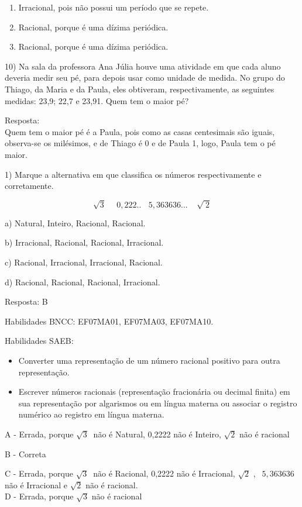 \begin{enumerate}
\def\labelenumi{\alph{enumi})}
\item
  Irracional, pois não possui um período que se repete.
\item
  Racional, porque é uma dízima periódica.
\item
  Racional, porque é uma dízima periódica.
\end{enumerate}

10) Na sala da professora Ana Júlia houve uma atividade em que cada
aluno deveria medir seu pé, para depois usar como unidade de medida. No
grupo do Thiago, da Maria e da Paula, eles obtiveram, respectivamente,
as seguintes medidas: 23,9; 22,7 e 23,91. Quem tem o maior pé?

Resposta:\\
Quem tem o maior pé é a Paula, pois como as casas centesimais são
iguais, observa-se os milésimos, e de Thiago é 0 e de Paula 1, logo,
Paula tem o pé maior.


1) Marque a alternativa em que classifica os números respectivamente e
corretamente.

\[\sqrt{3}\ \ \ \ \ \ 0,222..\ \ \ \ 5,363636...\ \ \ \ \ \sqrt{\ 2}\]

a) Natural, Inteiro, Racional, Racional.

b) Irracional, Racional, Racional, Irracional.

c) Racional, Irracional, Irracional, Racional.

d) Racional, Racional, Racional, Irracional.

Resposta: B

Habilidades BNCC: EF07MA01, EF07MA03, EF07MA10.

Habilidades SAEB:

\begin{itemize}
\item
  Converter uma representação de um número racional positivo para outra
  representação.
\item
  Escrever números racionais (representação fracionária ou decimal
  finita) em sua representação por algarismos ou em língua materna ou
  associar o registro numérico ao registro em língua materna.
\end{itemize}

A - Errada, porque \(\sqrt{3}\ \) não é Natural, 0,2222 não é Inteiro,
\(\sqrt{2}\) não é racional

B - Correta

C - Errada, porque \(\sqrt{3}\ \) não é Racional, 0,2222 não é
Irracional, \(\sqrt{2}\) , \(\ \ 5,363636\)não é Irracional e
\(\sqrt{2}\) não é racional.\\
D - Errada, porque \(\sqrt{3}\) não é racional

